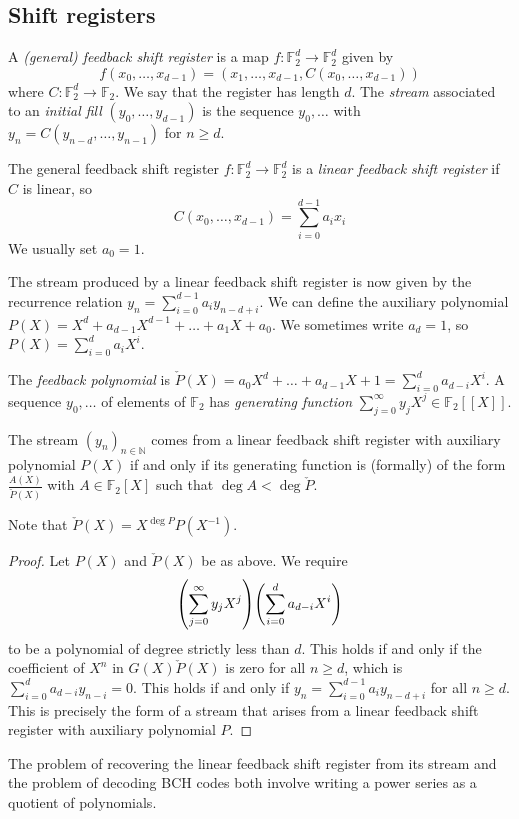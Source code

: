 \subsection{Shift registers}
\begin{definition}
    A \emph{(general) feedback shift register} is a map \( f \colon \mathbb F_2^d \to \mathbb F_2^d \) given by
    \[ f(x_0, \dots, x_{d-1}) = (x_1, \dots, x_{d-1}, C(x_0, \dots, x_{d-1})) \]
    where \( C \colon \mathbb F_2^d \to \mathbb F_2 \).
    We say that the register has length \( d \).
    The \emph{stream} associated to an \emph{initial fill} \( (y_0, \dots, y_{d-1}) \) is the sequence \( y_0, \dots \) with \( y_n = C(y_{n-d}, \dots, y_{n-1}) \) for \( n \geq d \).
\end{definition}
\begin{definition}
    The general feedback shift register \( f \colon \mathbb F_2^d \to \mathbb F_2^d \) is a \emph{linear feedback shift register} if \( C \) is linear, so
    \[ C(x_0, \dots, x_{d-1}) = \sum_{i=0}^{d-1} a_i x_i \]
    We usually set \( a_0 = 1 \).
\end{definition}
The stream produced by a linear feedback shift register is now given by the recurrence relation \( y_n = \sum_{i=0}^{d-1} a_i y_{n-d+i} \).
We can define the auxiliary polynomial \( P(X) = X^d + a_{d-1} X^{d-1} + \dots + a_1 X + a_0 \).
We sometimes write \( a_d = 1 \), so \( P(X) = \sum_{i=0}^d a_i X^i \).
\begin{definition}
    The \emph{feedback polynomial} is \( \check{P}(X) = a_0 X^d + \dots + a_{d-1} X + 1 = \sum_{i=0}^d a_{d-i} X^i \).
    A sequence \( y_0, \dots \) of elements of \( \mathbb F_2 \) has \emph{generating function} \( \sum_{j=0}^\infty y_j X^j \in \mathbb F_2[\![X]\!] \).
\end{definition}
\begin{theorem}
    The stream \( (y_n)_{n \in \mathbb N} \) comes from a linear feedback shift register with auxiliary polynomial \( P(X) \) if and only if its generating function is (formally) of the form \( \frac{A(X)}{\check{P}(X)} \) with \( A \in \mathbb F_2[X] \) such that \( \deg A < \deg \check{P} \).
\end{theorem}
Note that \( \check{P}(X) = X^{\deg P}P(X^{-1}) \).
\begin{proof}
    Let \( P(X) \) and \( \check{P}(X) \) be as above.
    We require
    \[ \qty(\sum_{j=0}^\infty y_j X^j) \qty(\sum_{i=0}^d a_{d-i} X^i) \]
    to be a polynomial of degree strictly less than \( d \).
    This holds if and only if the coefficient of \( X^n \) in \( G(X) \check{P}(X) \) is zero for all \( n \geq d \), which is \( \sum_{i=0}^d a_{d-i} y_{n-i} = 0 \).
    This holds if and only if \( y_n = \sum_{i=0}^{d-1} a_i y_{n-d + i} \) for all \( n \geq d \).
    This is precisely the form of a stream that arises from a linear feedback shift register with auxiliary polynomial \( P \).
\end{proof}
The problem of recovering the linear feedback shift register from its stream and the problem of decoding BCH codes both involve writing a power series as a quotient of polynomials.

